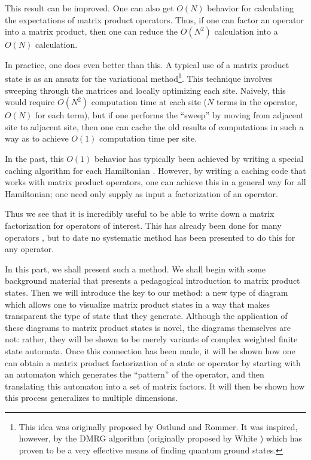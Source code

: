 \documentclass{amsbook}
\theoremstyle{plain}
\theoremstyle{definition}
\theoremstyle{remark}
\begin{document}
This result can be improved.  One can also get $O(N)$ behavior for calculating the expectations of matrix product operators.  Thus, if one can factor an operator into a matrix product, then one can reduce the $O(N^2)$ calculation into a $O(N)$ calculation.

In practice, one does even better than this.  A typical use of a matrix product state is as an ansatz for the variational method\footnote{This idea was originally proposed by Ostlund and Rommer\cite{Ostlund:1995uq}.  It was inspired, however, by the DMRG algorithm (originally proposed by White \cite{White:1992ys}) which has proven to be a very effective means of finding quantum ground states.}.  This technique involves sweeping through the matrices and locally optimizing each site.  Naively, this would require $O(N^2)$ computation time at each site ($N$ terms in the operator, $O(N)$ for each term), but if one performs the ``sweep'' by moving from adjacent site to adjacent site, then one can cache the old results of computations in such a way as to achieve $O(1)$ computation time per site.

In the past, this $O(1)$ behavior has typically been achieved by writing a special caching algorithm for each Hamiltonian \cite{cond-mat/0404706}.  However, by writing a caching code that works with matrix product operators, one can achieve this in a general way for all Hamiltonian;  one need only supply as input a factorization of an operator.

Thus we see that it is incredibly useful to be able to write down a matrix factorization for operators of interest.  This has already been done for many operators \cite{cond-mat/0701428}, but to date no systematic method has been presented to do this for any operator.

In this part, we shall present such a method.  We shall begin with some background material that presents a pedagogical introduction to matrix product states.  Then we will introduce the key to our method:  a new type of diagram which allows one to visualize matrix product states in a way that makes transparent the type of state that they generate.  Although the application of these diagrams to matrix product states is novel, the diagrams themselves are not:  rather, they will be shown to be merely variants of complex weighted finite state automata.  Once this connection has been made, it will be shown how one can obtain a matrix product factorization of a state or operator by starting with an automaton which generates the ``pattern'' of the operator, and then translating this automaton into a set of matrix factors.  It will then be shown how this process generalizes to multiple dimensions.
\end{document}
